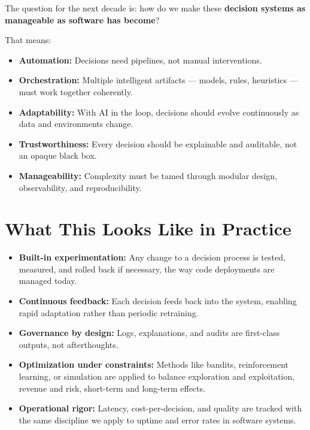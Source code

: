 \documentclass[
  letterpaper,
  DIV=11,
  numbers=noendperiod]{scrartcl}
\providecommand{\tightlist}{%
  \setlength{\itemsep}{0pt}\setlength{\parskip}{0pt}}
\begin{document}
The question for the next decade is: how do we make these
\textbf{decision systems as manageable as software has become}?

That means:

\begin{itemize}
\tightlist
\item
  \textbf{Automation:} Decisions need pipelines, not manual
  interventions.\\
\item
  \textbf{Orchestration:} Multiple intelligent artifacts --- models,
  rules, heuristics --- must work together coherently.\\
\item
  \textbf{Adaptability:} With AI in the loop, decisions should evolve
  continuously as data and environments change.\\
\item
  \textbf{Trustworthiness:} Every decision should be explainable and
  auditable, not an opaque black box.\\
\item
  \textbf{Manageability:} Complexity must be tamed through modular
  design, observability, and reproducibility.
\end{itemize}

\section{What This Looks Like in
Practice}\label{what-this-looks-like-in-practice}

\begin{itemize}
\tightlist
\item
  \textbf{Built-in experimentation:} Any change to a decision process is
  tested, measured, and rolled back if necessary, the way code
  deployments are managed today.\\
\item
  \textbf{Continuous feedback:} Each decision feeds back into the
  system, enabling rapid adaptation rather than periodic retraining.\\
\item
  \textbf{Governance by design:} Logs, explanations, and audits are
  first-class outputs, not afterthoughts.\\
\item
  \textbf{Optimization under constraints:} Methods like bandits,
  reinforcement learning, or simulation are applied to balance
  exploration and exploitation, revenue and risk, short-term and
  long-term effects.\\
\item
  \textbf{Operational rigor:} Latency, cost-per-decision, and quality
  are tracked with the same discipline we apply to uptime and error
  rates in software systems.
\end{itemize}
\end{document}
